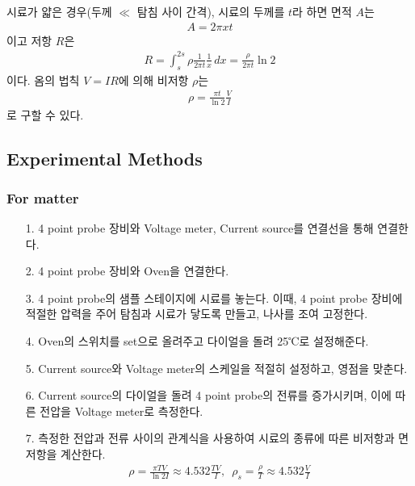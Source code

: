 \documentclass[aps,reprint,superscriptaddress,10pt]{revtex4-2}
\begin{document}
시료가 얇은 경우(두께 $\ll$ 탐침 사이 간격), 시료의 두께를 $t$라 하면 면적 $A$는 
\begin{align}
    A = 2\pi xt
\end{align}
이고 저항 $R$은
\begin{align}
    R = \int_s^{2s} \rho\frac{1}{2\pi t}\frac{1}{x}\,dx =  \frac{\rho}{2\pi t}
    \ln{2}
\end{align}
이다. 옴의 법칙 $V=IR$에 의해 비저항 $\rho$는
\begin{align}
    \rho = \frac{\pi t}{\ln{2}}\frac{V}{I}
\end{align}
로 구할 수 있다. 


\subsection{Experimental Methods}
\subsubsection{For matter}
\begin{itemize}
    \item[1. ]
    4 point probe 장비와 Voltage meter, Current source를 연결선을 통해 연결한다.
    \item[2. ]
    4 point probe 장비와 Oven을 연결한다.
    \item[3. ]
    4 point probe의 샘플 스테이지에 시료를 놓는다. 이때, 4 point probe 장비에 
    적절한 압력을 주어 탐침과 시료가 닿도록 만들고, 나사를 조여 고정한다. 
    \item[4. ]
    Oven의 스위치를 set으로 올려주고 다이얼을 돌려 25℃로 설정해준다.
    \item[5. ]
    Current source와 Voltage meter의 스케일을 적절히 설정하고, 영점을 맞춘다.
    \item[6. ]
    Current source의 다이얼을 돌려 4 point probe의 전류를 증가시키며, 
    이에 따른 전압을 Voltage meter로 측정한다.
    \item[7. ] 
    측정한 전압과 전류 사이의 관계식을 사용하여 시료의 종류에 
    따른 비저항과 면저항을 계산한다. 
    \begin{align}
        \rho = \frac{\pi TV}{\ln{2I}}\approx 4.532\frac{TV}{I},\,\,\,
        \rho_s = \frac{\rho}{T}\approx 4.532\frac{V}{I}
    \end{align}

\end{itemize}
\end{document}
